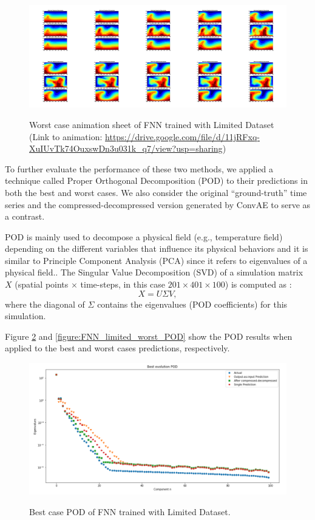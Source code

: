 \begin{figure}[H]
    \centering
    \caption{Worst case animation sheet of FNN trained with Limited Dataset (Link to animation: 
    \url{https://drive.google.com/file/d/11jRFxq-XuIUvTk74OuxswDn3u031k_q7/view?usp=sharing})}
    \includegraphics[scale=0.10]{figures/mantle_convection_images/limited_dataset/FNN_Worst_GIF_sheet.png}
    \label{figure:FNN_limited_worst_gif}
\end{figure}

To further evaluate the performance of these two methods, we applied a technique called Proper Orthogonal Decomposition (POD) to their predictions in both the best and worst cases. We also consider the original ``ground-truth'' time series and the compressed-decompressed version generated by ConvAE to serve as a contrast.

POD is mainly used to decompose a physical field (e.g., temperature field) depending on the different variables that influence its physical behaviors and it is similar to Principle Component Analysis (PCA) since it refers to eigenvalues of a physical field.\citep{10.1146_annurev.fl.25.010193.002543}. The Singular Value Decomposition (SVD) of a simulation matrix $X$ (spatial points $\times$ time-steps, in this case $201 \times 401 \times 100$) is computed as \citep{10.1515_9783110671490-007}:
\begin{equation}
X = U\Sigma V,
\end{equation}
where the diagonal of $\Sigma$ contains the eigenvalues (POD coefficients) for this simulation.

Figure \ref{figure:FNN_limited_best_POD} and \ref{figure:FNN_limited_worst_POD} show the POD results when applied to the best and worst cases predictions, respectively.

\begin{figure}[H]
    \caption{Best case POD of FNN trained with Limited Dataset.}
    \includegraphics[scale=0.5]{figures/mantle_convection_images/limited_dataset/FNN_Best_POD.png}
    \label{figure:FNN_limited_best_POD}
\end{figure}

